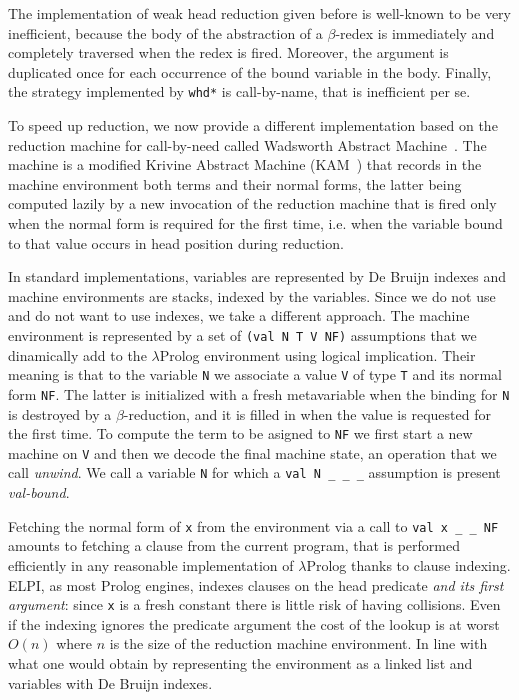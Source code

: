The implementation of weak head reduction given before is well-known to be very inefficient, because the body of the abstraction of a $\beta$-redex is immediately and completely traversed when the redex is fired. Moreover, the argument is duplicated once for each occurrence of the bound variable in the body. Finally, the strategy implemented by \verb+whd*+ is call-by-name, that is inefficient per se.

To speed up reduction, we now provide a different implementation based on the reduction machine for call-by-need called Wadsworth Abstract Machine~\cite{beniamino}. The machine is a modified Krivine Abstract Machine (KAM~\cite{kam}) that records in the machine environment both terms and their normal forms, the latter being computed lazily by a new invocation of the reduction machine that is fired only when the normal form is required for the first time, i.e. when the variable bound to that value occurs in head position during reduction.

In standard implementations, variables are represented by De Bruijn indexes and machine environments are stacks, indexed by the variables. Since we do not use and do not want to use indexes, we take a different approach. The machine environment is represented by a set of \verb+(val N T V NF)+ assumptions that we dinamically add to the $\lambda$Prolog environment using logical implication. Their meaning is that to the variable \verb+N+ we associate a value \verb+V+ of type \verb+T+ and its normal form \verb+NF+. The latter is initialized with a fresh metavariable when the binding for \verb+N+ is destroyed by a $\beta$-reduction, and it is filled in when the value is requested for the first time. To compute the term to be asigned to \verb+NF+ we first start a new machine on \verb+V+ and then we decode the final machine state, an operation that we call \emph{unwind}.  We call a variable \verb+N+ for which a \verb+val N _ _ _+ assumption is present \emph{val-bound}.

Fetching the normal form of \verb+x+ from the environment via a call to \verb+val x _ _ NF+ amounts to fetching a clause from the current program, that is performed efficiently in any reasonable implementation of $\lambda$Prolog thanks to clause indexing.  ELPI, as most Prolog engines, indexes clauses on the head predicate \emph{and its first argument}: since \verb+x+ is a fresh constant there is little risk of having collisions.  Even if the indexing ignores the predicate argument the cost of the lookup is at worst $O(n)$ where $n$ is the size of the reduction machine environment.  In line with what one would obtain by representing the environment as a linked list and variables with De Bruijn indexes.


